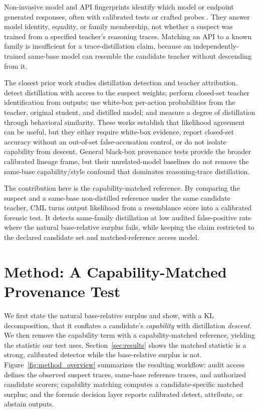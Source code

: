 \documentclass[journal]{IEEEtran}
\begin{document}
Non-invasive model and API fingerprints identify which model or endpoint generated
responses, often with calibrated tests or crafted probes
\citep{pasquini2025llmmap, gao2025modelequalitytesting, gubri2024trap,
jin2024proflingo}. They answer model identity, equality, or family membership, not
whether a suspect was trained from a specified teacher's reasoning traces. Matching
an API to a known family is insufficient for a trace-distillation claim, because an
independently-trained same-base model can resemble the candidate teacher without
descending from it.

The closest prior work studies distillation detection and teacher attribution.
\citet{shi2025distillationdetection} detect distillation with access to the suspect
weights; \citet{wadhwa2025whotaught} perform closed-set teacher identification from
outputs; \citet{liu2025wheredid} use white-box per-action probabilities from the
teacher, original student, and distilled model; and \citet{lee2025quantification}
measure a degree of distillation through behavioral similarity. These works establish
that likelihood agreement can be useful, but they either require white-box evidence,
report closed-set accuracy without an out-of-set false-accusation control, or do not
isolate capability from descent. General black-box provenance tests
\citep{nikolic2025modelprovenance, qiu2026provenanceset} provide the broader
calibrated lineage frame, but their unrelated-model baselines do not remove the
same-base capability/style confound that dominates reasoning-trace distillation.

The contribution here is the capability-matched reference. By comparing the suspect
and a same-base non-distilled reference under the same candidate teacher, CML turns
output likelihood from a resemblance score into a calibrated forensic test. It detects
same-family distillation at low audited false-positive rate where the natural
base-relative surplus fails, while keeping the claim restricted to the declared
candidate set and matched-reference access model.

\section{Method: A Capability-Matched Provenance Test}
\label{sec:method}

We first state the natural base-relative surplus and show, with a KL decomposition,
that it conflates a candidate's \emph{capability} with distillation \emph{descent}.
We then remove the capability term with a capability-matched reference, yielding the
statistic our test uses. Section~\ref{sec:results} shows the matched statistic is a
strong, calibrated detector while the base-relative surplus is not.
Figure~\ref{fig:method_overview} summarizes the resulting workflow: audit access
defines the observed suspect traces, same-base reference traces, and authorized
candidate scorers; capability matching computes a candidate-specific matched
surplus; and the forensic decision layer reports calibrated detect, attribute, or
abstain outputs.
\end{document}
